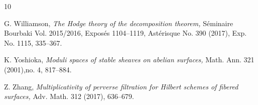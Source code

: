 \documentclass[11pt]{amsart}
\theoremstyle{plain}
\theoremstyle{definition}
\theoremstyle{remark}
\begin{document}
\begin{thebibliography}{10}


 G. Williamson, {\em The Hodge theory of the decomposition theorem,} S\'eminaire Bourbaki Vol. 2015/2016, Expos\'es 1104--1119, Ast\'erisque No. 390 (2017), Exp. No. 1115, 335--367.

 K. Yoshioka, {\em Moduli spaces of stable sheaves on abelian surfaces,} Math. Ann. 321 (2001),no. 4, 817--884.

 Z. Zhang, {\em Multiplicativity of perverse filtration for Hilbert schemes of fibered surfaces,} Adv. Math. 312 (2017), 636--679.

\end{thebibliography}
\end{document}
